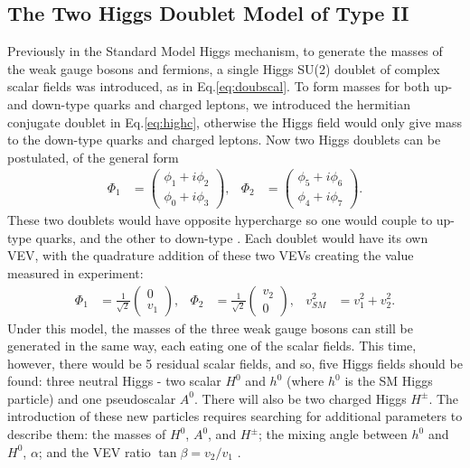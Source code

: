 \documentclass[a4paper,12pt]{article}
\begin{document}
\subsection{The Two Higgs Doublet Model of Type II}
\label{subsec:2hdm}
Previously in the Standard Model Higgs mechanism, to generate the masses of the weak gauge bosons and fermions, a single Higgs SU(2) doublet of complex scalar fields was introduced, as in Eq.\eqref{eq:doubscal}.
To form masses for both up- and down-type quarks and charged leptons, we introduced the hermitian conjugate doublet in Eq.\eqref{eq:highc}, otherwise the Higgs field would only give mass to the down-type quarks and charged leptons. 
Now two Higgs doublets can be postulated, of the general form
\begin{align}
    \label{eq:gdbl}
    \Phi_1 &= \begin{pmatrix} \phi_1 + i\phi_2 \\ \phi_0 + i\phi_3\end{pmatrix}, & \Phi_2 &= \begin{pmatrix} \phi_5+i\phi_6\\\phi_4+i\phi_7\end{pmatrix}.
\end{align}
These two doublets would have opposite hypercharge so one would couple to up-type quarks, and the other to down-type \cite{branco}. 
Each doublet would have its own VEV, with the quadrature addition of these two VEVs creating the value measured in experiment:
\begin{align}
    \label{eq:dbldbl}
    \Phi_1 &= \frac{1}{\sqrt{2}}\begin{pmatrix}0\\v_1\end{pmatrix}, & \Phi_2 &= \frac{1}{\sqrt{2}}\begin{pmatrix}v_2\\0\end{pmatrix}, & v_{SM}^2 &= v_1^2 + v_2^2.
\end{align}
Under this model, the masses of the three weak gauge bosons can still be generated in the same way, each eating one of the scalar fields. 
This time, however, there would be 5 residual scalar fields, and so, five Higgs fields should be found: three neutral Higgs - two scalar $H^0$ and $h^0$ (where $h^0$ is the SM Higgs particle) and one pseudoscalar $A^0$.
There will also be two charged Higgs $H^\pm$.
The introduction of these new particles requires searching for additional parameters to describe them: the masses of $H^0$, $A^0$, and $H^\pm$; the mixing angle between $h^0$ and $H^0$, $\alpha$; and the VEV ratio $\tan\beta=v_2/v_1$ \cite{hunter}.
\end{document}
